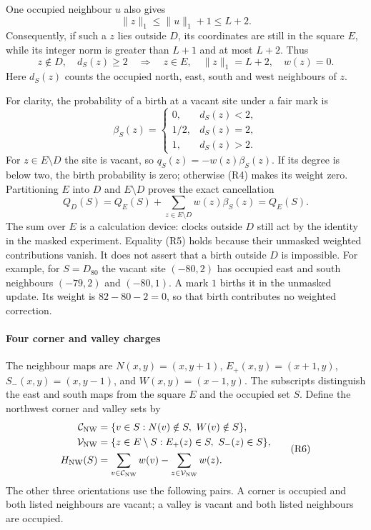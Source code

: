 \documentclass[
  11pt,
  a4paper,
]{article}
\begin{document}
One occupied neighbour \(u\) also gives \[
\|z\|_1\leq\|u\|_1+1\leq L+2.
\] Consequently, if such a \(z\) lies outside \(D\), its coordinates are
still in the square \(E\), while its integer norm is greater than
\(L+1\) and at most \(L+2\). Thus \[
z\notin D,\quad d_S(z)\geq2
\quad\Longrightarrow\quad z\in E,\quad\|z\|_1=L+2,\quad w(z)=0.
\tag{R4}
\] Here \(d_S(z)\) counts the occupied north, east, south and west
neighbours of \(z\).

For clarity, the probability of a birth at a vacant site under a fair
mark is \[
\beta_S(z)=
\begin{cases}
0,&d_S(z)<2,\\
1/2,&d_S(z)=2,\\
1,&d_S(z)>2.
\end{cases}
\] For \(z\in E\setminus D\) the site is vacant, so
\(q_S(z)=-w(z)\beta_S(z)\). If its degree is below two, the birth
probability is zero; otherwise (R4) makes its weight zero. Partitioning
\(E\) into \(D\) and \(E\setminus D\) proves the exact cancellation \[
Q_D(S)=Q_E(S)+\sum_{z\in E\setminus D}w(z)\beta_S(z)=Q_E(S).
\tag{R5}
\] The sum over \(E\) is a calculation device: clocks outside \(D\)
still act by the identity in the masked experiment. Equality (R5) holds
because their unmasked weighted contributions vanish. It does not assert
that a birth outside \(D\) is impossible. For example, for \(S=D_{80}\)
the vacant site \((-80,2)\) has occupied east and south neighbours
\((-79,2)\) and \((-80,1)\). A mark \(1\) births it in the unmasked
update. Its weight is \(82-80-2=0\), so that birth contributes no
weighted correction.

\paragraph{Four corner and valley
charges}\label{four-corner-and-valley-charges}

The neighbour maps are \(N(x,y)=(x,y+1)\), \(E_+(x,y)=(x+1,y)\),
\(S_-(x,y)=(x,y-1)\), and \(W(x,y)=(x-1,y)\). The subscripts distinguish
the east and south maps from the square \(E\) and the occupied set
\(S\). Define the northwest corner and valley sets by \[
\begin{aligned}
\mathcal C_{\rm NW}&=\{v\in S:N(v)\notin S,\ W(v)\notin S\},\\
\mathcal V_{\rm NW}&=\{z\in E\setminus S:E_+(z)\in S,\ S_-(z)\in S\},\\
H_{\rm NW}(S)&=\sum_{v\in\mathcal C_{\rm NW}}w(v)
              -\sum_{z\in\mathcal V_{\rm NW}}w(z).
\end{aligned}
\tag{R6}
\] The other three orientations use the following pairs. A corner is
occupied and both listed neighbours are vacant; a valley is vacant and
both listed neighbours are occupied.
\end{document}
